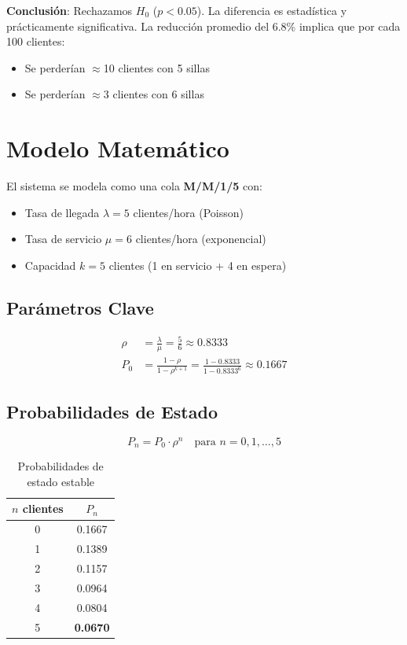 \documentclass{article}
\begin{document}
\textbf{Conclusión}: Rechazamos $H_0$ ($p < 0.05$). La diferencia es estadística y prácticamente significativa. La reducción promedio del 6.8\% implica que por cada 100 clientes:
\begin{itemize}
    \item Se perderían $\approx$10 clientes con 5 sillas
    \item Se perderían $\approx$3 clientes con 6 sillas
\end{itemize}
\section{Modelo Matemático}
El sistema se modela como una cola \textbf{M/M/1/5} con:
\begin{itemize}
    \item Tasa de llegada $\lambda = 5$ clientes/hora (Poisson)
    \item Tasa de servicio $\mu = 6$ clientes/hora (exponencial)
    \item Capacidad $k = 5$ clientes (1 en servicio + 4 en espera)
\end{itemize}

\subsection{Parámetros Clave}
\begin{align*}
    \rho &= \frac{\lambda}{\mu} = \frac{5}{6} \approx 0.8333 \\
    P_0 &= \frac{1 - \rho}{1 - \rho^{k+1}} = \frac{1 - 0.8333}{1 - 0.8333^6} \approx 0.1667
\end{align*}

\subsection{Probabilidades de Estado}
\[
P_n = P_0 \cdot \rho^n \quad \text{para } n = 0,1,\dots,5
\]

\begin{table}[H]
    \centering
    \caption{Probabilidades de estado estable}
    \begin{tabular}{cc}
        \toprule
        $n$ clientes & $P_n$ \\
        \midrule
        0 & 0.1667 \\
        1 & 0.1389 \\
        2 & 0.1157 \\
        3 & 0.0964 \\
        4 & 0.0804 \\
        5 & \textbf{0.0670} \\
        \bottomrule
    \end{tabular}
\end{table}
\end{document}
